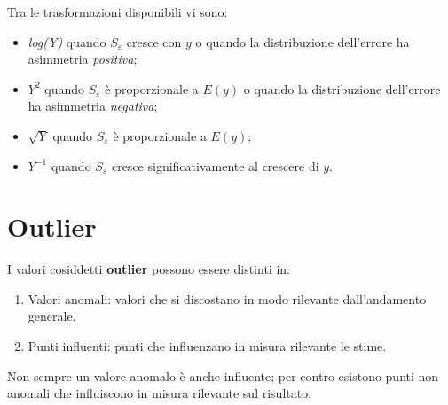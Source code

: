 \documentclass[a4page, 11pt]{article} %
\begin{document}
Tra le trasformazioni disponibili vi sono:

\begin{itemize}[noitemsep]
\item \textit{log(Y)} quando $S_\varepsilon$ cresce con $y$ o quando la distribuzione dell'errore ha asimmetria \textit{positiva};
\item \textit{$Y^2$} quando $S_\varepsilon$ è proporzionale a $E(y)$ o quando la distribuzione dell'errore ha asimmetria \textit{negativa};
\item \textit{$\sqrt{Y}$} quando $S_\varepsilon$ è proporzionale a $E(y)$;
\item \textit{$Y^{-1}$} quando $S_\varepsilon$ cresce significativamente al crescere di $y$.
\end{itemize}

\section{Outlier}
I valori cosiddetti \textbf{outlier} possono essere distinti in:
\begin{enumerate}[noitemsep]
\item Valori anomali: valori che si discostano in modo rilevante dall’andamento generale.
\item Punti influenti: punti che influenzano in misura rilevante le stime.
\end{enumerate}
Non sempre un valore anomalo è anche influente; per contro esistono punti non anomali che influiscono in misura rilevante sul risultato.
\end{document}
